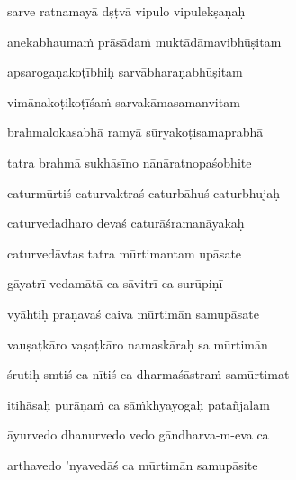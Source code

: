 sarve ratnamayā dṣṭvā vipulo vipulekṣaṇaḥ\thinspace{\dandab} \dontdisplaylinenum

anekabhaumaṁ prāsādaṁ muktādāmavibhūṣitam \veg\dontdisplaylinenum
{}

apsarogaṇakoṭībhiḥ sarvābharaṇabhūṣitam\thinspace{\dandab} \dontdisplaylinenum

vimānakoṭikoṭīśaṁ sarvakāmasamanvitam \veg\dontdisplaylinenum
{}

brahmalokasabhā ramyā sūryakoṭisamaprabhā\thinspace{\dandab} \dontdisplaylinenum

tatra brahmā sukhāsīno nānāratnopaśobhite \veg\dontdisplaylinenum

caturmūrtiś caturvaktraś caturbāhuś caturbhujaḥ\thinspace{\dandab} \dontdisplaylinenum

caturvedadharo devaś caturāśramanāyakaḥ \veg\dontdisplaylinenum

caturvedāvtas tatra mūrtimantam upāsate\thinspace{\dandab} \dontdisplaylinenum

gāyatrī vedamātā ca sāvitrī ca surūpiṇī \veg\dontdisplaylinenum

vyāhtiḥ praṇavaś caiva mūrtimān samupāsate\thinspace{\dandab} \dontdisplaylinenum

vauṣaṭkāro vaṣaṭkāro namaskāraḥ sa mūrtimān \veg\dontdisplaylinenum
{}

śrutiḥ smtiś ca nītiś ca dharmaśāstraṁ samūrtimat\thinspace{\dandab} \dontdisplaylinenum

itihāsaḥ purāṇaṁ ca sāṁkhyayogaḥ patañjalam \veg\dontdisplaylinenum
{}

āyurvedo dhanurvedo vedo gāndharva-m-eva ca\thinspace{\dandab} \dontdisplaylinenum

arthavedo 'nyavedāś ca mūrtimān samupāsite \veg\dontdisplaylinenum
{}


